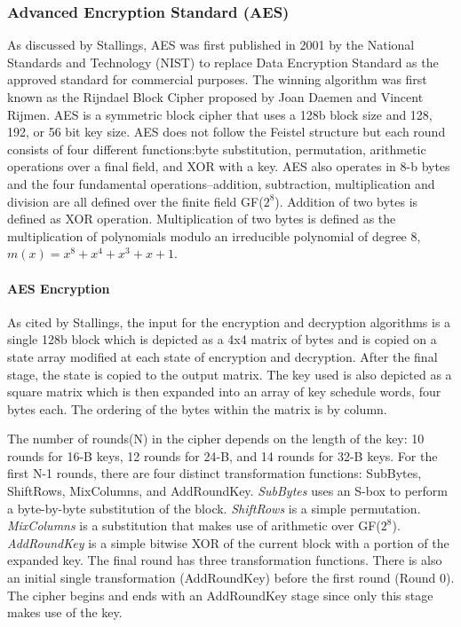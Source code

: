 \documentclass{article}
\begin{document}
\subsubsection{Advanced Encryption Standard (AES)}
As discussed by Stallings\cite{stallings2011}, AES was first published in 2001 by the National Standards and Technology (NIST) to replace Data Encryption Standard as the approved standard for commercial purposes. The winning algorithm was first known as the Rijndael Block Cipher proposed by Joan Daemen and Vincent Rijmen. AES is a symmetric block cipher that uses a 128b block size and 128, 192, or 56 bit key size. AES does not follow the Feistel structure but each round consists of four different functions:byte substitution, permutation, arithmetic operations over a final field, and XOR with a key. AES also operates in 8-b bytes and the four fundamental operations--addition, subtraction, multiplication and division are all defined over the finite field GF($2^{8}$). Addition of two bytes is defined as XOR operation. Multiplication of two bytes is defined as the multiplication of polynomials modulo an irreducible polynomial of degree 8, $m(x)=x^{8}+x^{4}+x^{3}+x+1$.

\paragraph{AES Encryption}
As cited by Stallings\cite{stallings2011}, the input for the encryption and decryption algorithms is a single 128b  block which is depicted as a 4x4 matrix of bytes and is copied on a state array modified at each state of encryption and decryption. After the final stage, the state is copied to the output matrix. The key used is also depicted as a square matrix which is then expanded into an array of key schedule words, four bytes each. The ordering of the bytes within the matrix is by column.

The number of rounds(N) in the cipher depends on the length of the key: 10 rounds for 16-B keys, 12 rounds for 24-B, and 14 rounds for 32-B keys. For the first N-1 rounds, there are four distinct transformation functions: SubBytes, ShiftRows, MixColumns, and AddRoundKey. \textit{SubBytes} uses an S-box to perform a byte-by-byte substitution of the block. \textit{ShiftRows} is a simple permutation. \textit{MixColumns} is a substitution that makes use of arithmetic over GF($2^{8}$). \textit{AddRoundKey} is a simple bitwise XOR of the current block with a portion of the expanded key. The final round has  three transformation functions. There is also an initial single transformation (AddRoundKey) before the first round (Round 0). The cipher begins and ends with an AddRoundKey stage since only this stage makes use of the key.
\end{document}
